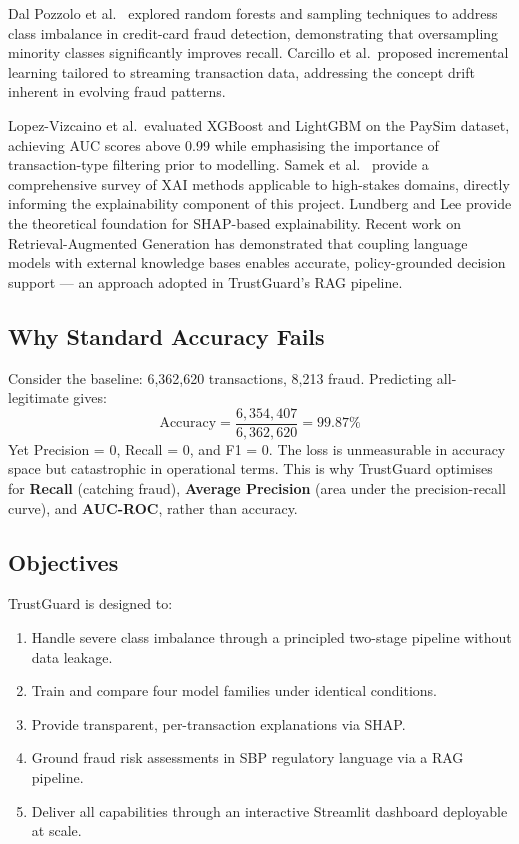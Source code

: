 \documentclass[12pt,a4paper]{article}
\begin{document}
Dal Pozzolo et al.\ \cite{dalpozzolo} explored random forests and sampling techniques to address class imbalance in credit-card fraud detection, demonstrating that oversampling minority classes significantly improves recall. Carcillo et al.\ proposed incremental learning tailored to streaming transaction data, addressing the concept drift inherent in evolving fraud patterns.

Lopez-Vizcaino et al.\ evaluated XGBoost and LightGBM on the PaySim dataset, achieving AUC scores above 0.99 while emphasising the importance of transaction-type filtering prior to modelling. Samek et al.\ \cite{samek} provide a comprehensive survey of XAI methods applicable to high-stakes domains, directly informing the explainability component of this project. Lundberg and Lee \cite{shap} provide the theoretical foundation for SHAP-based explainability. Recent work on Retrieval-Augmented Generation has demonstrated that coupling language models with external knowledge bases enables accurate, policy-grounded decision support --- an approach adopted in TrustGuard's RAG pipeline.

\subsection{Why Standard Accuracy Fails}

Consider the baseline: 6,362,620 transactions, 8,213 fraud. Predicting all-legitimate gives:
\[
\text{Accuracy} = \frac{6{,}354{,}407}{6{,}362{,}620} = 99.87\%
\]
Yet Precision = 0, Recall = 0, and F1 = 0. The loss is unmeasurable in accuracy space but catastrophic in operational terms. This is why TrustGuard optimises for \textbf{Recall} (catching fraud), \textbf{Average Precision} (area under the precision-recall curve), and \textbf{AUC-ROC}, rather than accuracy.

\subsection{Objectives}

TrustGuard is designed to:
\begin{enumerate}[noitemsep]
  \item Handle severe class imbalance through a principled two-stage pipeline without data leakage.
  \item Train and compare four model families under identical conditions.
  \item Provide transparent, per-transaction explanations via SHAP.
  \item Ground fraud risk assessments in SBP regulatory language via a RAG pipeline.
  \item Deliver all capabilities through an interactive Streamlit dashboard deployable at scale.
\end{enumerate}
\end{document}

